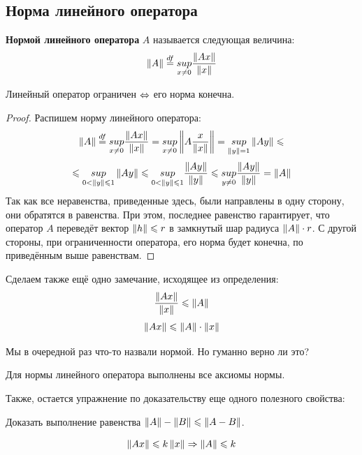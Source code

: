 \documentclass[12pt]{article}
\begin{document}
	\subsection{Норма линейного оператора}
	
		\begin{defi}
			\textbf{Нормой линейного оператора} $A$ называется следующая величина: 
			$$\left\| A \right\| \overset{df}{=} \underset{x \neq 0}{sup} \frac{\left\| Ax \right\|}{\left\| x \right\|}$$
		\end{defi}
	
		\begin{state}
			Линейный оператор ограничен $\Leftrightarrow$ его норма конечна.
		\end{state}
		\begin{proof}
			Распишем норму линейного оператора:
			$$
				\left\| A \right\| \overset{df}{=} \underset{x \neq 0}{sup} \frac{\left\| Ax \right\|}{\left\| x \right\|} = 
				\underset{x \neq 0}{sup} \left\| A \frac{x}{\left\| x \right\|} \right\| =
				\underset{\left\| y \right\| = 1}{sup} \left\| Ay \right\| \leqslant
			$$
			$$
				\leqslant
				\underset{0 < \left\| y \right\| \leqslant 1}{sup} \left\| Ay \right\| \leqslant
				\underset{0 < \left\| y \right\| \leqslant 1}{sup} \frac{\left\| Ay \right\|}{\left\| y \right\|} \leqslant
				\underset{y \neq 0}{sup} \frac{\left\| Ay \right\|}{\left\| y \right\|} =
				\left\| A \right\|
			$$
			Так как все неравенства, приведенные здесь, были направлены в одну сторону,
			они обратятся в равенства. При этом, последнее равенство гарантирует, что
			оператор $A$ переведёт вектор $\left\| h \right\| \leqslant r$ в замкнутый шар радиуса $\left\| A \right\| \cdot r$.
			С другой стороны, при ограниченности оператора, его норма будет конечна, по приведённым
			выше равенствам.
		\end{proof}
	
		Сделаем также ещё одно замечание, исходящее из определения:
		$$ \frac{\left\| Ax \right\|}{\left\| x \right\|} \leqslant \left\| A \right\| $$
		$$ \left\| Ax \right\| \leqslant \left\| A \right\| \cdot \left\| x \right\| $$
	
		Мы в очередной раз что-то назвали нормой. Но {\color{gray}гуманно} верно ли это?
	
		\exc Для нормы линейного оператора выполнены все аксиомы нормы.
	
		Также, остается упражнение по доказательству еще одного полезного свойства:
	
		\exc Доказать выполнение равенства $\left\| A \right\| - \left\| B \right\| \leqslant \left\| A-B \right\|$.
	
		\begin{state}
			$$\left\| Ax \right\| \leqslant k \left\| x \right\| \Rightarrow \left\| A \right\| \leqslant k$$
		\end{state}
	
\end{document}

